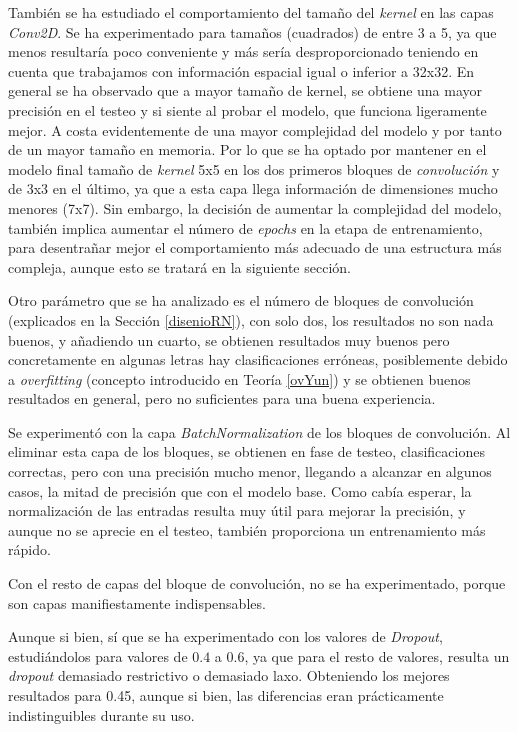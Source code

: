 \begin{appendices}
También se ha estudiado el comportamiento del tamaño del \textit{kernel} en
las capas \textit{Conv2D}. Se ha experimentado para tamaños (cuadrados) de entre 3 a 5, ya
que menos resultaría poco conveniente y más sería desproporcionado teniendo en
cuenta que trabajamos con información espacial igual o inferior a 32x32.
En general se ha observado que a mayor tamaño de kernel, se obtiene una mayor
precisión en el testeo y si siente al probar el modelo, que funciona ligeramente
mejor. A costa evidentemente de una mayor complejidad del modelo y por tanto
de un mayor tamaño en memoria. Por lo que se ha optado por mantener en el
modelo final tamaño de \textit{kernel} 5x5 en los dos primeros bloques de \textit{convolución}
y de 3x3 en el último, ya que a esta capa llega información de dimensiones mucho menores
(7x7). Sin embargo, la decisión de aumentar la complejidad del modelo, también
implica aumentar el número de \textit{epochs} en la etapa de entrenamiento, para
desentrañar mejor el comportamiento más adecuado de una estructura más compleja,
aunque esto se tratará en la siguiente sección.

Otro parámetro que se ha analizado es el número de bloques de convolución (explicados
en la Sección \ref{disenioRN}), con solo dos, los resultados no son nada buenos, y
añadiendo un cuarto, se obtienen resultados muy buenos pero concretamente en algunas
letras hay clasificaciones erróneas, posiblemente debido a \textit{overfitting}
(concepto introducido en Teoría \ref{ovYun}) y se obtienen buenos resultados en general,
pero no suficientes para una buena experiencia.

Se experimentó con la capa \textit{BatchNormalization} de los bloques de convolución.
Al eliminar esta capa de los bloques, se obtienen en fase de testeo, clasificaciones
correctas, pero con una precisión mucho menor, llegando a alcanzar en algunos casos,
la mitad de precisión que con el modelo base. Como cabía esperar, la normalización de
las entradas resulta muy útil para mejorar la precisión, y aunque no se aprecie en
el testeo, también proporciona un entrenamiento más rápido.

Con el resto de capas del bloque de convolución, no se ha experimentado, porque
son capas manifiestamente indispensables.

Aunque si bien, sí que se ha experimentado con los valores de \textit{Dropout}, estudiándolos
para valores de $0.4$ a $0.6$, ya que para el resto de valores, resulta un \textit{dropout}
demasiado restrictivo o demasiado laxo. Obteniendo los mejores resultados para 0.45, aunque
si bien, las diferencias eran prácticamente indistinguibles durante su uso.


\end{appendices}
